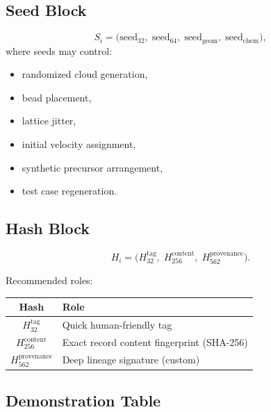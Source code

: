 \documentclass[11pt, a4paper, oneside]{article}
\begin{document}
\subsection{Seed Block}

\begin{equation}
\label{eq:seed_block}
S_i = \bigl(\text{seed}_{32},\;\text{seed}_{64},\;
            \text{seed}_{\text{geom}},\;\text{seed}_{\text{chem}}\bigr),
\end{equation}
where seeds may control:
\begin{itemize}
  \item randomized cloud generation,
  \item bead placement,
  \item lattice jitter,
  \item initial velocity assignment,
  \item synthetic precursor arrangement,
  \item test case regeneration.
\end{itemize}

\subsection{Hash Block}

\begin{equation}
\label{eq:hash_block}
H_i = \bigl(H_{32}^{\text{tag}},\; H_{256}^{\text{content}},\;
            H_{562}^{\text{provenance}}\bigr).
\end{equation}

Recommended roles:
\begin{center}
\begin{tabular}{@{} c l @{}}
\toprule
\textbf{Hash} & \textbf{Role}\\
\midrule
$H_{32}^{\text{tag}}$         & Quick human-friendly tag\\
$H_{256}^{\text{content}}$    & Exact record content fingerprint (SHA-256)\\
$H_{562}^{\text{provenance}}$ & Deep lineage signature (custom)\\
\bottomrule
\end{tabular}
\end{center}

\subsection{Demonstration Table}
\end{document}
